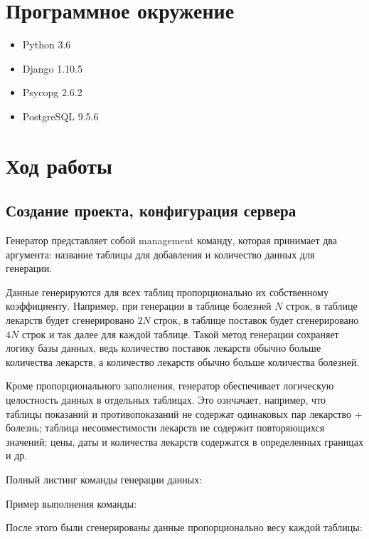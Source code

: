 \documentclass[14pt,a4paper,report]{report}
\begin{document}
\section{Программное окружение}

\begin{itemize}
	\item Python 3.6
	\item Django 1.10.5
	\item Psycopg 2.6.2
	\item PostgreSQL 9.5.6
\end{itemize}

\section{Ход работы}

\subsection{Создание проекта, конфигурация сервера}

Генератор представляет собой management команду, которая принимает два аргумента: название таблицы для добавления и количество данных для генерации. 

Данные генерируются для всех таблиц пропорционально их собственному коэффициенту. Например, при генерации в таблице болезней $N$ строк, в таблице лекарств будет сгенерировано $2N$ строк, в таблице поставок будет сгенерировано $4N$ строк и так далее для каждой таблице. Такой метод генерации сохраняет логику базы данных, ведь количество поставок лекарств обычно больше количества лекарств, а количество лекарств обычно больше количества болезней.

Кроме пропорционального заполнения, генератор обеспечивает логическую целостность данных в отдельных таблицах. Это ознчачает, например, что таблицы показаний и противопоказаний не содержат одинаковых пар лекарство + болезнь; таблица несовместимости лекарств не содержит повторяющихся значений; цены, даты и количества лекарств содержатся в определенных границах и др.

Полный листинг команды генерации данных:



Пример выполнения команды:



После этого были сгенерированы данные пропорционально весу каждой таблицы:
\end{document}
